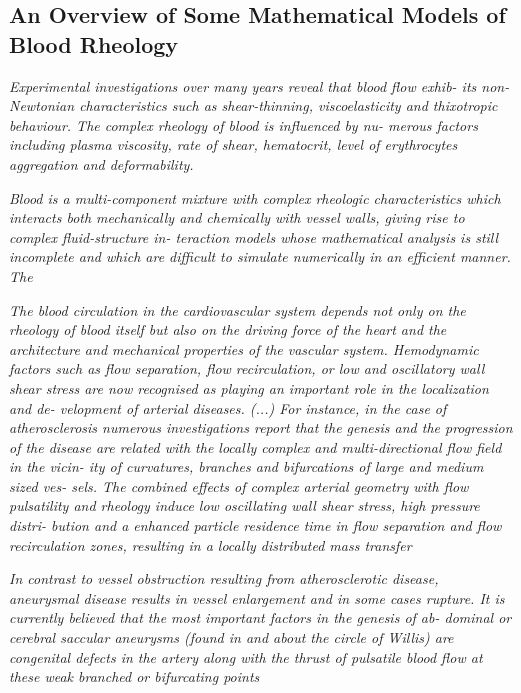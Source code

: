 \documentclass[11pt,letterpaper]{article}
\begin{document}
\newpage
\subsection{An Overview of Some Mathematical Models of Blood Rheology}


\textit{Experimental investigations over many years reveal that blood flow exhib- its non-Newtonian characteristics such as shear-thinning, viscoelasticity and thixotropic behaviour. The complex rheology of blood is influenced by nu- merous factors including plasma viscosity, rate of shear, hematocrit, level of erythrocytes aggregation and deformability.}

\textit{Blood is a multi-component mixture with complex rheologic characteristics which interacts both mechanically and chemically with vessel walls, giving rise to complex fluid-structure in- teraction models whose mathematical analysis is still incomplete and which are difficult to simulate numerically in an efficient manner. The}

\textit{The blood circulation in the cardiovascular system depends not only on the rheology of blood itself but also on the driving force of the heart and the architecture and mechanical properties of the vascular system. Hemodynamic factors such as flow separation, flow recirculation, or low and oscillatory wall shear stress are now recognised as playing an important role in the localization and de- velopment of arterial diseases. (...) For instance, in the case of atherosclerosis numerous investigations report that the genesis and the progression of the disease are related with the locally complex and multi-directional flow field in the vicin- ity of curvatures, branches and bifurcations of large and medium sized ves- sels. The combined effects of complex arterial geometry with flow pulsatility and rheology induce low oscillating wall shear stress, high pressure distri- bution and a enhanced particle residence time in flow separation and flow recirculation zones, resulting in a locally distributed mass transfer}

\textit{In contrast to vessel obstruction resulting from atherosclerotic disease, aneurysmal disease results in vessel enlargement and in some cases rupture. It is currently believed that the most important factors in the genesis of ab- dominal or cerebral saccular aneurysms (found in and about the circle of Willis) are congenital defects in the artery along with the thrust of pulsatile blood flow at these weak branched or bifurcating points}
\end{document}
